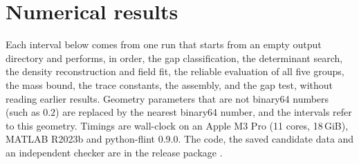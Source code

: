 \section{Numerical results}\label{sec:results}
Each interval below comes from one run that starts from an empty output
directory and performs, in order, the gap classification, the determinant
search, the density reconstruction and field fit, the reliable evaluation of
all five groups, the mass bound, the trace constants, the assembly, and the
gap test, without reading earlier results. Geometry parameters that are not
binary64 numbers (such as $0.2$) are replaced by the nearest binary64 number,
and the intervals refer to this geometry. Timings are wall-clock on an Apple M3
Pro (11 cores, 18\,GiB), MATLAB R2023b and python-flint 0.9.0. The code, the
saved candidate data and an independent checker are in the release package
.

